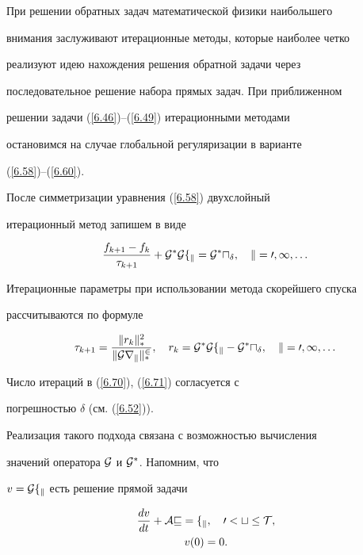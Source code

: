 При решении обратных задач математической физики наибольшего


внимания заслуживают итерационные методы, которые наиболее четко


реализуют идею нахождения решения обратной задачи через


последовательное решение набора прямых задач. При приближенном


решении задачи (\ref{6.46})--(\ref{6.49}) итерационными методами


остановимся на случае глобальной регуляризации в варианте


(\ref{6.58})--(\ref{6.60}).





После симметризации уравнения (\ref{6.58}) двухслойный


итерационный метод запишем в виде


\begin{equation}\label{6.70}


\frac{f_{k+1} - f_k}{\tau_{k+1}} + \cal{G}^* \cal{G} f_k


= \cal{G}^* u_{\delta} ,


\quad  k = 0,1, \dotsc


\end{equation}


Итерационные параметры при использовании метода скорейшего спуска


рассчитываются по формуле


\begin{equation}\label{6.71}


\tau_{k+1} =  \frac{\|r_k\|_*^2}{\|\cal{G} r_k\|_*^2} ,


\quad r_k =\cal{G}^* \cal{G} f_k - \cal{G}^* u_{\delta} ,


\quad k =0,1, \dotsc


\end{equation}


Число итераций в (\ref{6.70}), (\ref{6.71}) согласуется с


погрешностью $\delta$ (см. (\ref{6.52})).





Реализация такого подхода связана с возможностью вычисления


значений оператора $\cal{G}$ и $\cal{G}^*$. Напомним, что


$v = \cal{G} f_k$ есть решение прямой задачи


\begin{gather}\label{6.72}


\frac{d v}{d t} + \cal{A} v = f_k ,


\quad 0 < t \le T, \\


%


\label{6.73}


v(0) = 0 .


\end{gather}


